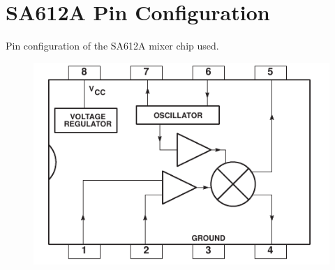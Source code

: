 \section{SA612A Pin Configuration}
\label{app:SA612A}
Pin configuration of the SA612A mixer chip used\cite{SA612A}.
\begin{figure}[h!]
	\begin{center}
		\includegraphics[scale=1]{report_img/SA612A_crop}
	\end{center}
\end{figure}

